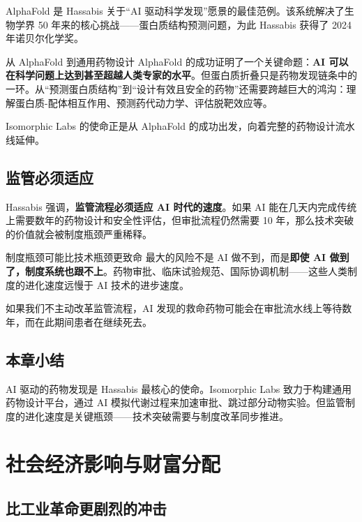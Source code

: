 \documentclass[a4paper]{article}
\begin{document}
AlphaFold 是 Hassabis 关于``AI 驱动科学发现''愿景的最佳范例。该系统解决了生物学界 50 年来的核心挑战——蛋白质结构预测问题，为此 Hassabis 获得了 2024 年诺贝尔化学奖。

\begin{knowledgebox}{从 AlphaFold 到通用药物设计}
AlphaFold 的成功证明了一个关键命题：\textbf{AI 可以在科学问题上达到甚至超越人类专家的水平}。但蛋白质折叠只是药物发现链条中的一环。从``预测蛋白质结构''到``设计有效且安全的药物''还需要跨越巨大的鸿沟：理解蛋白质-配体相互作用、预测药代动力学、评估脱靶效应等。

Isomorphic Labs 的使命正是从 AlphaFold 的成功出发，向着完整的药物设计流水线延伸。
\end{knowledgebox}

\subsection{监管必须适应}

Hassabis 强调，\textbf{监管流程必须适应 AI 时代的速度}。如果 AI 能在几天内完成传统上需要数年的药物设计和安全性评估，但审批流程仍然需要 10 年，那么技术突破的价值就会被制度瓶颈严重稀释。

\begin{warningbox}{制度瓶颈可能比技术瓶颈更致命}
最大的风险不是 AI 做不到，而是\textbf{即使 AI 做到了，制度系统也跟不上}。药物审批、临床试验规范、国际协调机制——这些人类制度的进化速度远慢于 AI 技术的进步速度。

如果我们不主动改革监管流程，AI 发现的救命药物可能会在审批流水线上等待数年，而在此期间患者在继续死去。
\end{warningbox}

\subsection{本章小结}

AI 驱动的药物发现是 Hassabis 最核心的使命。Isomorphic Labs 致力于构建通用药物设计平台，通过 AI 模拟代谢过程来加速审批、跳过部分动物实验。但监管制度的进化速度是关键瓶颈——技术突破需要与制度改革同步推进。

\section{社会经济影响与财富分配}

\subsection{比工业革命更剧烈的冲击}
\end{document}
